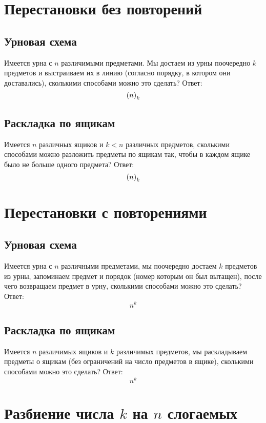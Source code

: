 \section{Перестановки без повторений}

\subsection{Урновая схема}

Имеется урна с $n$ различимыми предметами. Мы достаем из урны поочередно $k$ предметов и выстраиваем их в линию (согласно порядку, в котором они доставались), сколькими способами можно это сделать? Ответ: $$ \left({n}\right)_{k} $$

\subsection{Раскладка по ящикам}

Имеется $n$ различных ящиков и $k < n$ различных предметов, сколькими способами можно разложить предметы по ящикам так, чтобы в каждом ящике было не больше одного предмета? Ответ: $$ \left({n}\right)_{k} $$

\section{Перестановки с повторениями}

\subsection{Урновая схема}

Имеется урна с $n$ различными предметами, мы поочередно достаем $k$ предметов из урны, запоминаем предмет и порядок (номер которым он был вытащен), после чего возвращаем предмет в урну, сколькими способами можно это сделать? Ответ: $$ n^k $$

\subsection{Раскладка по ящикам}

Имеется $n$ различимых ящиков и $k$ различимых предметов, мы раскладываем предметы о ящикам (без ограничений на число предметов в ящике), сколькими способами можно это сделать? Ответ: $$ n^k $$

\section{Разбиение числа $k$ на $n$ слогаемых}

